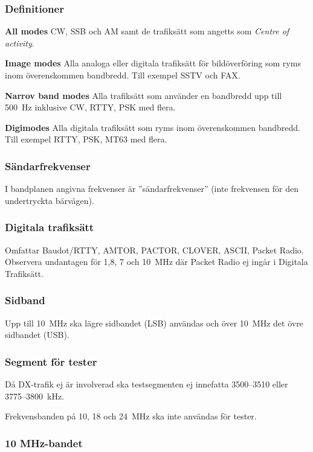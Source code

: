 \subsubsection{Definitioner}

\textbf{All modes} CW, SSB och AM samt de trafiksätt som angetts som
\emph{Centre of activity}.

\textbf{Image modes} Alla analoga eller digitala trafiksätt för bildöverföring
som ryms inom överenskommen bandbredd. Till exempel SSTV och FAX.

\textbf{Narrov band modes} Alla trafiksätt som använder en bandbredd upp till
500~Hz inklusive CW, RTTY, PSK med flera.

\textbf{Digimodes} Alla digitala trafiksätt som ryms inom överenskommen
bandbredd. Till exempel RTTY, PSK, MT63 med flera.

\subsubsection{Sändarfrekvenser}

I bandplanen angivna frekvenser är ''sändarfrekvenser''
(inte frekvensen för den undertryckta bärvågen).

\subsubsection{Digitala trafiksätt}

Omfattar Baudot/RTTY, AMTOR, PACTOR, CLOVER, ASCII, Packet Radio.
Observera undantagen för 1,8, 7 och 10~MHz där Packet Radio ej
ingår i Digitala Trafiksätt.

\subsubsection{Sidband}

Upp till 10~MHz ska lägre sidbandet (LSB) användas och över 10~MHz det övre
sidbandet (USB).

\subsubsection{Segment för tester}

Då DX-trafik ej är involverad ska testsegmenten ej innefatta
3500--3510 eller 3775--3800~kHz.

Frekvensbanden på 10, 18 och 24~MHz ska inte användas för tester.

\subsubsection{10 MHz-bandet}

